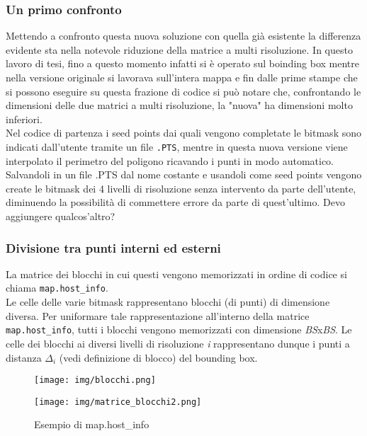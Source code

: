 			\subsubsection{Un primo confronto}
				Mettendo a confronto questa nuova soluzione con quella gi\`{a} esistente la differenza evidente sta nella notevole riduzione della matrice a multi risoluzione. In questo lavoro di tesi, fino a questo momento infatti si \`{e} operato sul boinding box mentre nella versione originale si lavorava sull'intera mappa e fin dalle prime stampe che si possono eseguire su questa frazione di codice si pu\`{o} notare che, confrontando le dimensioni delle due matrici a multi risoluzione, la "nuova" ha dimensioni molto inferiori.\\
				Nel codice di partenza i seed points dai quali vengono completate le bitmask sono indicati dall'utente tramite un file \texttt{.PTS}, mentre in questa nuova versione viene interpolato il perimetro del poligono ricavando i punti in modo automatico. Salvandoli in un file .PTS dal nome costante e usandoli come seed points vengono create le bitmask dei 4 livelli di risoluzione senza intervento da parte dell'utente, diminuendo la possibilit\`{a} di commettere errore da parte di quest'ultimo. Devo aggiungere qualcos'altro?

			\subsubsection{Divisione tra punti interni ed esterni}
				La matrice dei blocchi in cui questi vengono memorizzati in ordine di codice si chiama \texttt{map.host\_info}.\\
				Le celle delle varie bitmask rappresentano  blocchi (di punti) di dimensione diversa. Per uniformare tale rappresentazione all'interno della matrice \texttt{map.host\_info}, tutti i blocchi vengono memorizzati con dimensione \textit{BS}x\textit{BS}. Le celle dei blocchi ai diversi livelli di risoluzione \textit{i} rappresentano dunque i punti a distanza $\Delta_i$ (vedi definizione di blocco) del bounding box.
				\begin{figure}[htbp]
					\centering
					\texttt{[image: img/blocchi.png]}
				\end{figure}
				\begin{figure}[htbp]
					\centering
					\texttt{[image: img/matrice\_blocchi2.png]}
					\caption{Esempio di map.host\_info}
				\end{figure}

